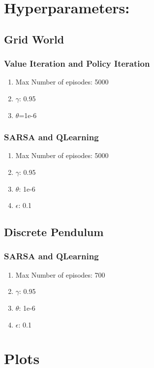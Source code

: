 \documentclass[conf]{new-aiaa}
\begin{document}
\section{Hyperparameters:}

\subsection{Grid World}
\subsubsection{Value Iteration and Policy Iteration}
\begin{enumerate}
    \item Max Number of episodes: 5000
    \item $\gamma$: 0.95
    \item $\theta$=1e-6
\end{enumerate}


\subsubsection{SARSA and QLearning}
\begin{enumerate}
    \item Max Number of episodes: 5000
    \item $\gamma$: 0.95
    \item $\theta$: 1e-6
    \item $\epsilon$: 0.1
\end{enumerate}


\subsection{Discrete Pendulum}

\subsubsection{SARSA and QLearning}
\begin{enumerate}
    \item Max Number of episodes: 700
    \item $\gamma$: 0.95
    \item $\theta$: 1e-6
    \item $\epsilon$: 0.1
\end{enumerate}




\section{Plots}
\end{document}
